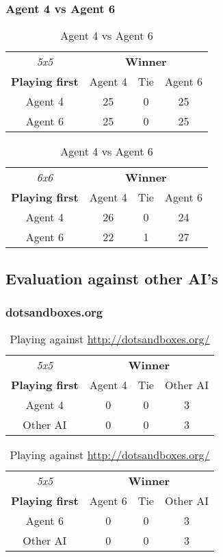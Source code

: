 \subsubsection{Agent 4 vs Agent 6}

\begin{table}[!h]
	\centering
	\label{result:Ag4vsAg6}
	\begin{tabular}{c | c | c | c}
		\textit{5x5} & \multicolumn{3}{c}{\textbf{Winner}}        \\
		\textbf{Playing first} & Agent 4 & Tie & Agent 6 \\ \hline
		Agent 4 & 25 & 0 & 25 \\ \hline
		Agent 6 & 25 & 0 & 25
	\end{tabular}
	\quad
	\begin{tabular}{c | c | c | c}
		\textit{6x6} & \multicolumn{3}{c}{\textbf{Winner}}        \\
		\textbf{Playing first} & Agent 4 & Tie & Agent 6 \\ \hline
		Agent 4 & 26 & 0 & 24 \\ \hline
		Agent 6 & 22 & 1 & 27
	\end{tabular}
	\caption{Agent 4 vs Agent 6}
\end{table}


\subsection{Evaluation against other AI's}
\subsubsection{dotsandboxes.org}
\begin{table}[!h]
	\centering
	\label{result:dotsandboxesorg}
	\begin{tabular}{c | c | c | c}
		\textit{5x5} & \multicolumn{3}{c}{\textbf{Winner}}        \\
		\textbf{Playing first} & Agent 4 & Tie & Other AI \\ \hline
		Agent 4 & 0 & 0 & 3 \\ \hline
		Other AI & 0 & 0 & 3
	\end{tabular}
	\quad
	\begin{tabular}{c | c | c | c}
		\textit{5x5} & \multicolumn{3}{c}{\textbf{Winner}}        \\
		\textbf{Playing first} & Agent 6 & Tie & Other AI \\ \hline
		Agent 6 & 0 & 0 & 3 \\ \hline
		Other AI & 0 & 0 & 3
	\end{tabular}
	\caption{Playing against \url{http://dotsandboxes.org/}}
\end{table}

